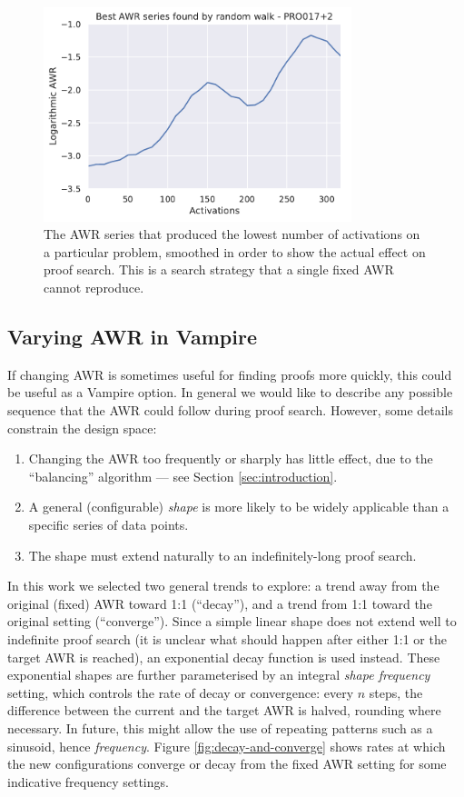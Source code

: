 \documentclass{llncs}
\begin{document}
\begin{figure}[t]
	\centering
	\includegraphics[width=0.8\textwidth]{random-walk}
	\caption{The AWR series that produced the lowest number of activations on a particular problem, smoothed in order to show the actual effect on proof search. This is a search strategy that a single fixed AWR cannot reproduce.}
	\label{fig:random-walk}
\end{figure}

\subsection{Varying AWR in Vampire} \label{sec:varying:implementation}

If changing AWR is sometimes useful for finding proofs more quickly, this could be useful as a Vampire option.
In general we would like to describe any possible sequence that the AWR could follow during proof search.
However, some details constrain the design space:
\begin{enumerate}
	\item Changing the AWR too frequently or sharply has little effect, due to the ``balancing'' algorithm --- see Section \ref{sec:introduction}.
	\item A general (configurable) \emph{shape} is more likely to be widely applicable than a specific series of data points.
	\item The shape must extend naturally to an indefinitely-long proof search.
\end{enumerate}

In this work we selected two general trends to explore: a trend away from the original (fixed) AWR toward 1:1 (``decay''), and a trend from 1:1 toward the original setting (``converge'').
Since a simple linear shape does not extend well to indefinite proof search (it is unclear what should happen after either 1:1 or the target AWR is reached), an exponential decay function is used instead.
These exponential shapes are further parameterised by an integral \emph{shape frequency} setting, which controls the rate of decay or convergence: every \(n\) steps, the difference between the current and the target AWR is halved, rounding where necessary.
In future, this might allow the use of repeating patterns such as a sinusoid, hence \emph{frequency}.
Figure \ref{fig:decay-and-converge} shows rates at which the new configurations converge or decay from the fixed AWR setting for some indicative frequency settings.
\end{document}
